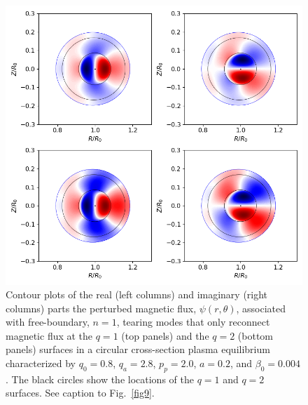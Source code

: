 \documentclass[12pt,prb,aps]{revtex4-1}
\begin{document}
\begin{figure}
\centerline{\includegraphics[width=\textwidth]{Fig18.png}}
\caption{Contour plots of the real (left columns) and imaginary (right columns) parts the perturbed magnetic flux, $\psi(r,\theta)$, associated with free-boundary, $n=1$, tearing modes that only reconnect magnetic flux at the $q=1$  (top panels) and the $q=2$ (bottom panels)  surfaces in a 
circular cross-section plasma equilibrium characterized by $q_0=0.8$, $q_a= 2.8$, $p_p=2.0$,
$a=0.2$, and $\beta_0 =0.004$.  The
black circles show the locations of the $q=1$ and $q=2$  surfaces. See caption to Fig.~\ref{fig9}.\label{fig18}}
\end{figure}
\end{document}
